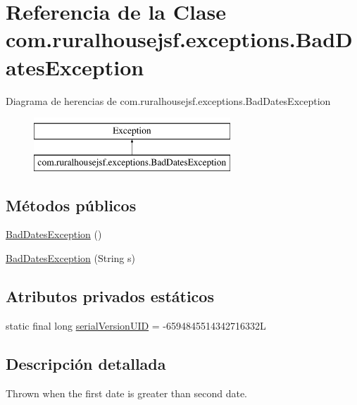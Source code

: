 \hypertarget{classcom_1_1ruralhousejsf_1_1exceptions_1_1_bad_dates_exception}{}\section{Referencia de la Clase com.\+ruralhousejsf.\+exceptions.\+Bad\+Dates\+Exception}
\label{classcom_1_1ruralhousejsf_1_1exceptions_1_1_bad_dates_exception}
Diagrama de herencias de com.\+ruralhousejsf.\+exceptions.\+Bad\+Dates\+Exception\begin{figure}[H]
\begin{center}
\leavevmode
\includegraphics[height=2.000000cm]{da/de2/classcom_1_1ruralhousejsf_1_1exceptions_1_1_bad_dates_exception}
\end{center}
\end{figure}
\subsection*{Métodos públicos}
\begin{DoxyCompactItemize}
\item 
\mbox{\hyperlink{classcom_1_1ruralhousejsf_1_1exceptions_1_1_bad_dates_exception_a0e519d0653a6b74703c8d586c3dca1bc}{Bad\+Dates\+Exception}} ()
\item 
\mbox{\hyperlink{classcom_1_1ruralhousejsf_1_1exceptions_1_1_bad_dates_exception_ace7222589b4c31c6b4a3d44d952c512a}{Bad\+Dates\+Exception}} (String s)
\end{DoxyCompactItemize}
\subsection*{Atributos privados estáticos}
\begin{DoxyCompactItemize}
\item 
static final long \mbox{\hyperlink{classcom_1_1ruralhousejsf_1_1exceptions_1_1_bad_dates_exception_a455e5569f117b53852ac14206bb2177f}{serial\+Version\+U\+ID}} = -\/6594845514342716332L
\end{DoxyCompactItemize}


\subsection{Descripción detallada}
Thrown when the first date is greater than second date. 

